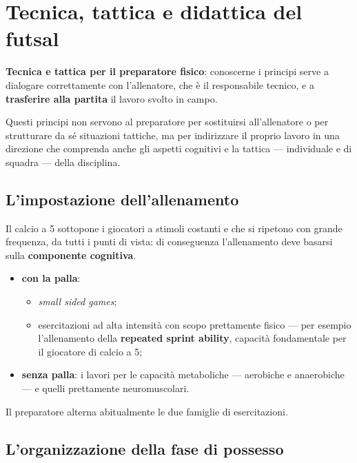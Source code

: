 \chapter{Tecnica, tattica e didattica del futsal}
\label{cap:tecnicatattica}

\textbf{Tecnica e tattica per il preparatore fisico}: conoscerne i principi serve a dialogare
correttamente con l'allenatore, che è il responsabile tecnico, e a \textbf{trasferire alla partita}
il lavoro svolto in campo.

Questi principi non servono al preparatore per sostituirsi all'allenatore o per strutturare da sé
situazioni tattiche, ma per indirizzare il proprio lavoro in una direzione che comprenda anche gli
aspetti cognitivi e la tattica --- individuale e di squadra --- della disciplina.

\section{L'impostazione dell'allenamento}

Il calcio a 5 sottopone i giocatori a stimoli costanti e che si ripetono con grande frequenza, da
tutti i punti di vista: di conseguenza l'allenamento deve basarsi sulla \textbf{componente
cognitiva}.

\begin{itemize}
  \item \textbf{con la palla}:
    \begin{itemize}
      \item \textit{small sided games};
      \item esercitazioni ad alta intensità con scopo prettamente fisico --- per esempio
        l'allenamento della \textbf{repeated sprint ability}, capacità fondamentale per il giocatore
        di calcio a 5;
    \end{itemize}
  \item \textbf{senza palla}: i lavori per le capacità metaboliche --- aerobiche e anaerobiche --- e
    quelli prettamente neuromuscolari.
\end{itemize}
Il preparatore alterna abitualmente le due famiglie di esercitazioni.

\section{L'organizzazione della fase di possesso}

